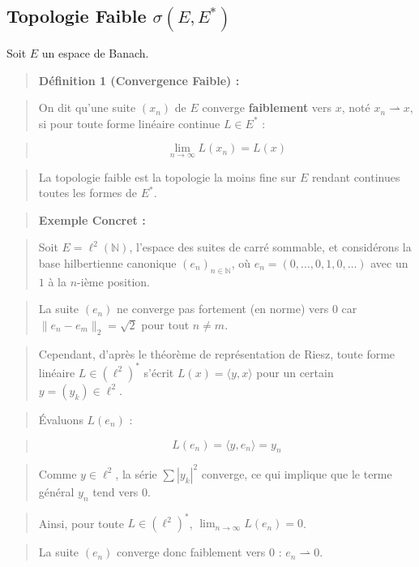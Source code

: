 \documentclass[11pt,a4paper]{article}
\begin{document}
\subsection*{Topologie Faible $\sigma(E, E^*)$}

Soit $E$ un espace de Banach.

\begin{quote}\textbf{Définition 1 (Convergence Faible) :}\end{quote}
\begin{quote}On dit qu'une suite $(x_n)$ de $E$ converge \textbf{faiblement} vers $x$, noté $x_n \rightharpoonup x$, si pour toute forme linéaire continue $L \in E^*$ :\end{quote}
\begin{quote}$$\lim_{n \to \infty} L(x_n) = L(x)$$\end{quote}
\begin{quote}La topologie faible est la topologie la moins fine sur $E$ rendant continues toutes les formes de $E^*$.\end{quote}

\begin{quote}\textbf{Exemple Concret :}\end{quote}
\begin{quote}Soit $E = \ell^2(\mathbb{N})$, l'espace des suites de carré sommable, et considérons la base hilbertienne canonique $(e_n)_{n \in \mathbb{N}}$, où $e_n = (0, \dots, 0, 1, 0, \dots)$ avec un $1$ à la $n$-ième position.\end{quote}
\begin{quote}La suite $(e_n)$ ne converge pas fortement (en norme) vers $0$ car $\|e_n - e_m\|_2 = \sqrt{2}$ pour tout $n \neq m$.\end{quote}
\begin{quote}Cependant, d'après le théorème de représentation de Riesz, toute forme linéaire $L \in (\ell^2)^*$ s'écrit $L(x) = \langle y, x \rangle$ pour un certain $y = (y_k) \in \ell^2$.\end{quote}
\begin{quote}Évaluons $L(e_n)$ :\end{quote}
\begin{quote}$$L(e_n) = \langle y, e_n \rangle = y_n$$\end{quote}
\begin{quote}Comme $y \in \ell^2$, la série $\sum |y_k|^2$ converge, ce qui implique que le terme général $y_n$ tend vers $0$.\end{quote}
\begin{quote}Ainsi, pour toute $L \in (\ell^2)^*$, $\lim_{n \to \infty} L(e_n) = 0$.\end{quote}
\begin{quote}La suite $(e_n)$ converge donc faiblement vers $0$ : $e_n \rightharpoonup 0$.\end{quote}
\end{document}
